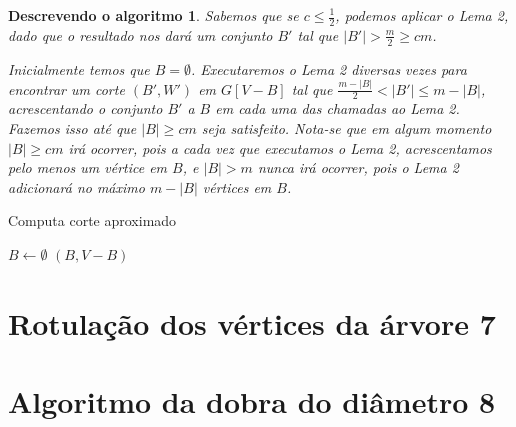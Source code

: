 \documentclass[a4paper,12pt]{article}
\newtheorem{alg}{Descrevendo o algoritmo}
\begin{document}
\medskip

\begin{alg}
	
	Sabemos que se $c \le \frac{1}{2}$, podemos aplicar o Lema 2, 
	dado que o resultado nos dará um conjunto $B'$ tal que
	$|B'|>\frac{m}{2}\ge cm$.

	Inicialmente temos que $B = \emptyset$.
	Executaremos o Lema 2 diversas vezes para encontrar 
	um corte $(B',W')$ em $G[V-B]$ tal que $\frac{m-|B|}{2}<|B'|\le m-|B|$,
	acrescentando o conjunto $B'$ a $B$ em cada uma das chamadas ao Lema 2.
	Fazemos isso até que $|B|\ge cm$ seja satisfeito.
	Nota-se que em algum momento $|B|\ge cm$ irá ocorrer, pois a cada vez
	que executamos o Lema 2, acrescentamos pelo menos um vértice em $B$,
	e $|B|>m$ nunca irá ocorrer, pois o Lema 2 adicionará no máximo 
	$m-|B|$ vértices em $B$.

\end{alg}

\begin{algorithm}[H]

	\caption{Computa corte aproximado}
	$B \gets \emptyset$\;
	{
	}
	\Return $(B,V-B)$

\end{algorithm}	

\section {Rotulação dos vértices da árvore 7}


\section {Algoritmo da dobra do diâmetro 8}
\end{document}
